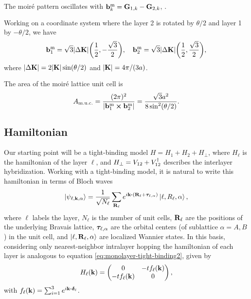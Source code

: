 The moiré pattern oscillates with $\vb{b}_k^{\text{m}} = \vb{G}_{1,k} - \vb{G}_{2,k}$, \cite{handbook2019}.

\n

Working on a coordinate system where the layer 2 is rotated by $\theta/2$ and layer 1 by $-\theta/2$, we have
\begin{equation} \label{eq:moire-bvecs}
\vb{b}_1^{\text{m}} = \sqrt{3} \abs{\Delta {\vb{K}}} \qty( \frac{1}{2}, -\frac{\sqrt{3}}{2}), \quad
\vb{b}_2^{\text{m}} = \sqrt{3} \abs{\Delta {\vb{K}}} \qty( \frac{1}{2},  \frac{\sqrt{3}}{2}),
\end{equation}
where $\abs{\Delta {\vb{K}}} = 2 \abs{{\vb{K}}} \sin(\theta/2)$ and $\abs{{\vb{K}}} = 4\pi/(3a)$.

The area of the moiré lattice unit cell is
\begin{equation} \label{eq:moire-unitcell}
A_{\text{m.u.c.}} = \frac{(2\pi)^2}{\abs{{\vb{b}}_1^{\text{m}} \cross {\vb{b}}_2^{\text{m}}}} = \frac{\sqrt{3} a^2}{8 \sin[2](\theta/2)}.
\end{equation}

\subsection{Hamiltonian}

Our starting point will be a tight-binding model $ H = H_1 + H_2 + H_{\perp} $, where $H_\ell$ is the hamiltonian of the layer $\ell$, and $H_\perp = V_{12} + V_{12}^{\dagger}$ describes the interlayer hybridization. Working with a tight-binding model, it is natural to write this hamiltonian in terms of Bloch waves
\begin{equation} \label{eq:BM-blochwave}
\ket{\psi_{\ell, \k, \alpha}} = \frac{1}{\sqrt{N_\ell}} \sum_{\R_\ell} e^{i \k \vdot (\R_\ell + \vtau_{\ell,\alpha})} \ket{\ell, R_\ell, \alpha},
\end{equation}
where $\ell$ labels the layer, $N_\ell$ is the number of unit cells, ${\vb{R}}_\ell$ are the positions of the underlying Bravais lattice, ${\bm{\tau}}_{\ell,\alpha}$ are the orbital centers (of sublattice $\alpha = A,B$) in the unit cell, and $\ket{\ell,{\vb{R}}_\ell,\alpha}$ are localized Wannier states. In this basis, considering only nearest-neighbor intralayer hopping the hamiltonian of each layer is analogous to equation \ref{eq:monolayer-tight-binding2}, given by
\begin{equation} \label{eq:blg-eachlayer-hamil}
H_\ell({\vb{k}}) =
\begin{pmatrix}
0 & -t f_\ell({\vb{k}}) \\
-t f_\ell({\vb{k}}) & 0
\end{pmatrix},
\end{equation}
with $f_\ell(\k) = \sum_{i=1}^{3} e^{i\k \vdot \vdelta_\ell}$.

